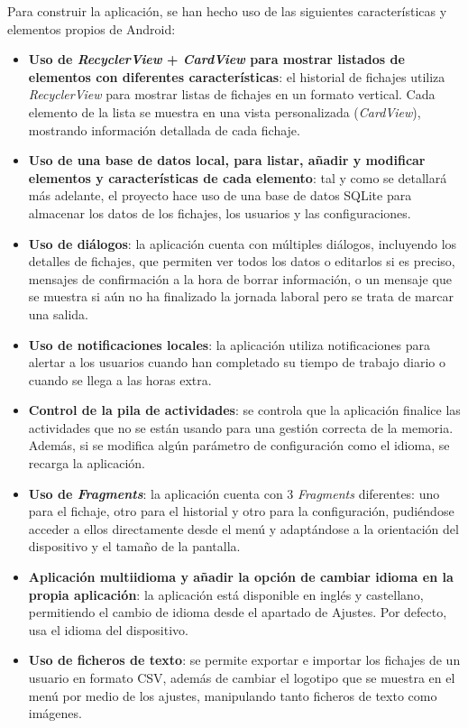 Para construir la aplicación, se han hecho uso de las siguientes características y elementos propios de Android:

\begin{itemize}
    \item \textbf{Uso de \textit{RecyclerView} + \textit{CardView} para mostrar listados de elementos con diferentes características}: el historial de fichajes utiliza \textit{RecyclerView} para mostrar listas de fichajes en un formato vertical. Cada elemento de la lista se muestra en una vista personalizada (\textit{CardView}), mostrando información detallada de cada fichaje.
    \item \textbf{Uso de una base de datos local, para listar, añadir y modificar elementos y características de cada elemento}: tal y como se detallará más adelante, el proyecto hace uso de una base de datos SQLite para almacenar los datos de los fichajes, los usuarios y las configuraciones.
    \item \textbf{Uso de diálogos}: la aplicación cuenta con múltiples diálogos, incluyendo los detalles de fichajes, que permiten ver todos los datos o editarlos si es preciso, mensajes de confirmación a la hora de borrar información, o un mensaje que se muestra si aún no ha finalizado la jornada laboral pero se trata de marcar una salida.
    \item \textbf{Uso de notificaciones locales}: la aplicación utiliza notificaciones para alertar a los usuarios cuando han completado su tiempo de trabajo diario o cuando se llega a las horas extra.
    \item \textbf{Control de la pila de actividades}: se controla que la aplicación finalice las actividades que no se están usando para una gestión correcta de la memoria. Además, si se modifica algún parámetro de configuración como el idioma, se recarga la aplicación.
    \item \textbf{Uso de \textit{Fragments}}: la aplicación cuenta con 3 \textit{Fragments} diferentes: uno para el fichaje, otro para el historial y otro para la configuración, pudiéndose acceder a ellos directamente desde el menú y adaptándose a la orientación del dispositivo y el tamaño de la pantalla.
    \item \textbf{Aplicación multiidioma y añadir la opción de cambiar idioma en la propia aplicación}: la aplicación está disponible en inglés y castellano, permitiendo el cambio de idioma desde el apartado de Ajustes. Por defecto, usa el idioma del dispositivo.
    \item \textbf{Uso de ficheros de texto}: se permite exportar e importar los fichajes de un usuario en formato CSV, además de cambiar el logotipo que se muestra en el menú por medio de los ajustes, manipulando tanto ficheros de texto como imágenes.

\end{itemize}
